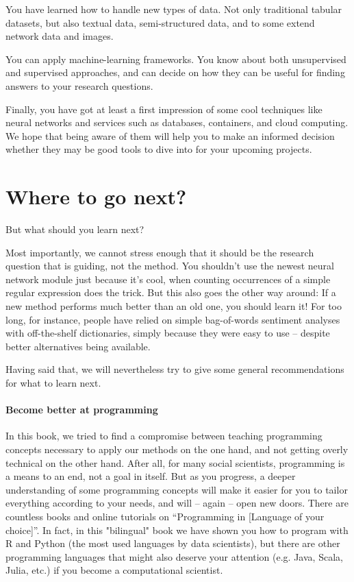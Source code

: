 You have learned how to handle new types of data. Not only traditional tabular datasets, but also textual data, semi-structured data, and to some extend network data and images.

You can apply machine-learning frameworks. You know about both unsupervised and supervised approaches, and can decide on how they can be useful for finding answers to your research questions.

Finally, you have got at least a first impression of some cool techniques like neural networks and services such as databases, containers, and cloud computing. We hope that being aware of them will help you to make an informed decision whether they may be good tools to dive into for your upcoming projects.



\section{Where to go next?}
But what should you learn next?

Most importantly, we cannot stress enough that it should be the research question that is guiding, not the method. You shouldn't use the newest neural network module just because it's cool, when counting occurrences of a simple regular expression does the trick. But this also goes the other way around: If a new method performs much better than an old one, you should learn it! For too long, for instance, people have relied on simple bag-of-words sentiment analyses with off-the-shelf dictionaries, simply because they were easy to use -- despite better alternatives being available.

Having said that, we will nevertheless try to give some general recommendations for what to learn next.

\paragraph{Become better at programming} In this book, we tried to find a compromise between teaching programming concepts necessary to apply our methods on the one hand, and not getting overly technical on the other hand. After all, for many social scientists, programming is a means to an end, not a goal in itself. But as you progress, a deeper understanding of some programming concepts will make it easier for you to tailor everything according to your needs, and will -- again -- open new doors. There are countless books and online tutorials on ``Programming in [Language of your choice]''. In fact, in this "bilingual" book we have shown you how to program with R and Python (the most used languages by data scientists), but there are other programming languages that might also deserve your attention (e.g. Java, Scala, Julia, etc.) if you become a computational scientist. 


